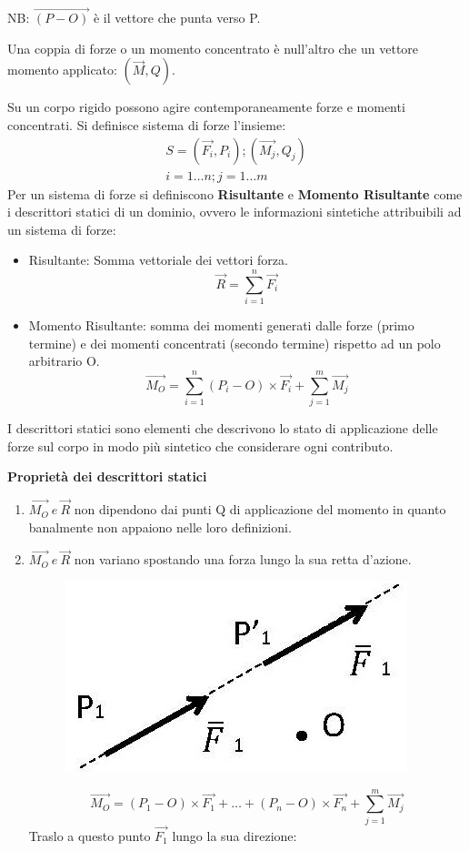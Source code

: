 \documentclass{article}
\begin{document}
\begin{adjustwidth}{2in}{}
\begin{itemize}
	NB: $\vec{(P-O)}$ è il vettore che punta verso P.
	
Una coppia di forze o un momento concentrato è null'altro che un vettore momento applicato: $(\vec{M}, Q)$. 
\end{itemize}
\newpage
Su un corpo rigido possono agire contemporaneamente forze e momenti concentrati. \newline
Si definisce sistema di forze l'insieme: 
\[ 
\begin{split}
S={(\vec{F_{i}}, P_{i}); (\vec{M_{j}}, Q_{j})}\\ i=1\dots n; j=1\dots m
\end{split}
\]
Per un sistema di forze si definiscono \textbf{Risultante} e \textbf{Momento Risultante} come i descrittori statici di un dominio, ovvero le informazioni sintetiche attribuibili ad un sistema di forze: 
\begin{itemize}
	\item Risultante: Somma vettoriale dei vettori forza.
	\[
	\vec{R} = \sum_{i=1}^{n} \vec{F_{i}}
	\]
\item Momento Risultante: somma dei momenti generati dalle forze (primo termine) e dei momenti concentrati (secondo termine) rispetto ad un polo arbitrario O.
	\[
	\vec{M_{O}} = \sum_{i=1}^{n} (P_{i}-O)\times \vec{F_{i}} + \sum_{j=1}^{m} \vec{M_{j}}
	\]	
	\end{itemize}
I descrittori statici sono elementi che descrivono lo stato di applicazione delle forze sul corpo in modo più sintetico che considerare ogni contributo. \newline 


{\Large \textbf{Proprietà dei descrittori statici}} 	\mbox{} \newline
\begin{enumerate}
\item $\vec{M_{O}} ~ e ~ \vec{R}$ non dipendono dai punti Q di applicazione del momento in quanto banalmente non appaiono nelle loro definizioni.
\item  $\vec{M_{O}} ~ e ~ \vec{R}$ non variano spostando una forza lungo la sua retta d'azione.
\begin{figure}[H]
	\centering
	\includegraphics[width=0.2\linewidth]{immagini/1.PARTE1_Pagina_07}
\end{figure}

	\[
	\vec{M_{O}} = (P_{1}-O)\times \vec{F_{1}} + \dots + (P_{n}-O)\times \vec{F_{n}} + \sum_{j=1}^{m} \vec{M_{j}}
	\]
	Traslo a questo punto $\vec{F_{1}}$ lungo la sua direzione:
	

\end{enumerate}
\end{adjustwidth}
\end{document}
